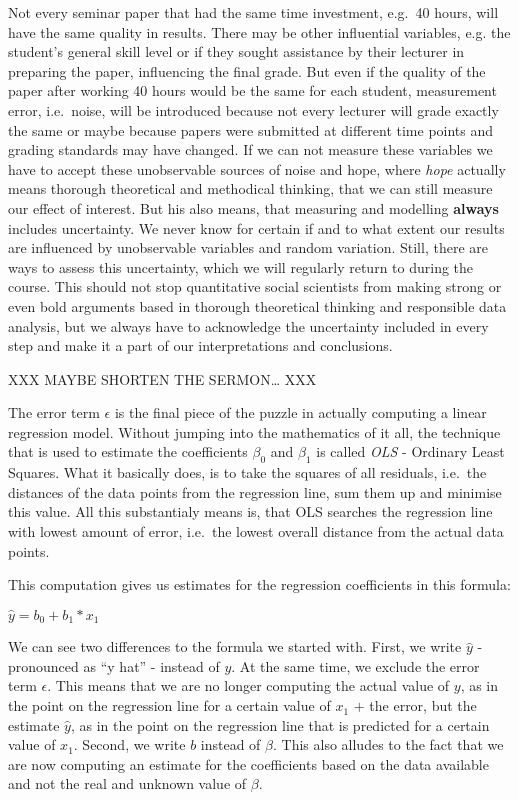 \documentclass[
]{book}
\begin{document}
Not every seminar paper that had the same time investment, e.g.~40 hours, will
have the same quality in results. There may be other influential variables, e.g.
the student's general skill level or if they sought assistance by their lecturer
in preparing the paper, influencing the final grade. But even if the quality of
the paper after working 40 hours would be the same for each student, measurement
error, i.e.~noise, will be introduced because not every lecturer will grade
exactly the same or maybe because papers were submitted at different time
points and grading standards may have changed. If we can not measure these
variables we have to accept these unobservable sources of noise and hope, where
\emph{hope} actually means thorough theoretical and methodical thinking, that we can
still measure our effect of interest. But his also means, that measuring and
modelling \textbf{always} includes uncertainty. We never know for certain if and to
what extent our results are influenced by unobservable variables and random
variation. Still, there are ways to assess this uncertainty, which we will
regularly return to during the course. This should not stop quantitative
social scientists from making strong or even bold arguments based in thorough
theoretical thinking and responsible data analysis, but we always have to
acknowledge the uncertainty included in every step and make it a part of our
interpretations and conclusions.

XXX MAYBE SHORTEN THE SERMON\ldots{} XXX

The error term \(\epsilon\) is the final piece of the puzzle in actually computing
a linear regression model. Without jumping into the mathematics of it all, the
technique that is used to estimate the coefficients \(\beta_0\) and \(\beta_1\) is
called \emph{OLS} - Ordinary Least Squares. What it basically does, is to take the
squares of all residuals, i.e.~the distances of the data points from the
regression line, sum them up and minimise this value. All this substantialy
means is, that OLS searches the regression line with lowest amount of error,
i.e.~the lowest overall distance from the actual data points.

This computation gives us estimates for the regression coefficients in this
formula:

\(\hat{y} = b_0 +b_1*x_1\)

We can see two differences to the formula we started with. First, we write
\(\hat{y}\) - pronounced as ``y hat'' - instead of \(y\). At the same time, we exclude
the error term \(\epsilon\). This means that we are no longer computing the actual
value of \(y\), as in the point on the regression line for a certain value of
\(x_1\) \(+\) the error, but the estimate \(\hat{y}\), as in the point on the
regression line that is predicted for a certain value of \(x_1\). Second, we write
\(b\) instead of \(\beta\). This also alludes to the fact that we are now
computing an estimate for the coefficients based on the data available and not
the real and unknown value of \(\beta\).
\end{document}
